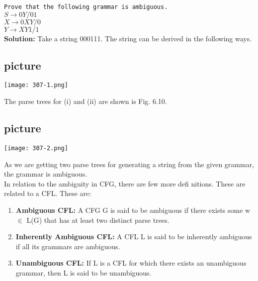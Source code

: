 \documentclass{article}
\begin{document}
\vspace*{0.5cm}
\hspace*{0.1cm} \texttt{Prove that the following grammar is ambiguous.}\\

\hspace*{4cm} $S \rightarrow 0Y/01$ \\
\hspace*{4cm} $X \rightarrow 0XY/0$ \\
\hspace*{4cm} $Y \rightarrow XY1/1$ \\

\vspace*{0.5cm}
\textbf{Solution: }Take a string 000111. The string can be derived in the following ways.\\

\vspace*{0.3cm}
\begin{flushleft}
  \section{picture}
\texttt{[image: 307-1.png]}
\end{flushleft}

The parse trees for (i) and (ii) are shown is Fig. 6.10.\\

\begin{center}
\section{picture}
\texttt{[image: 307-2.png]}
\end{center}

\hspace*{0.5cm} As we are getting two parse trees for generating a string from the given grammar, the grammar is
ambiguous.\\
\hspace*{0.5cm} In relation to the ambiguity in CFG, there are few more defi nitions. These are related to a CFL.
These are:\\

\vspace*{0.3cm}

\begin{enumerate}
  \item \textbf{Ambiguous CFL:} A CFG G is said to be ambiguous if there exists some w $\in$ L(G) that has at
least two distinct parse trees.\\
  \item \textbf{Inherently Ambiguous CFL:} A CFL L is said to be inherently ambiguous if all its grammars are
ambiguous.\\
  \item \textbf{Unambiguous CFL:} If L is a CFL for which there exists an unambiguous grammar, then L is said
to be unambiguous.\\
\end{enumerate}
\end{document}

